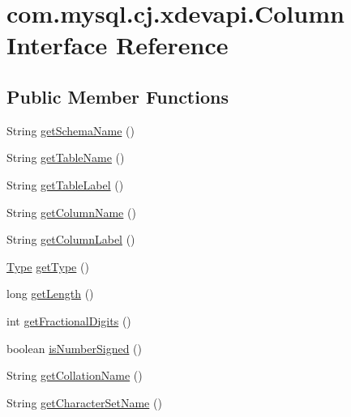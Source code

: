 \hypertarget{interfacecom_1_1mysql_1_1cj_1_1xdevapi_1_1_column}{}\section{com.\+mysql.\+cj.\+xdevapi.\+Column Interface Reference}
\label{interfacecom_1_1mysql_1_1cj_1_1xdevapi_1_1_column}
\subsection*{Public Member Functions}
\begin{DoxyCompactItemize}
\item 
String \mbox{\hyperlink{interfacecom_1_1mysql_1_1cj_1_1xdevapi_1_1_column_a7bd8bc89547c4033cc4518be120a2334}{get\+Schema\+Name}} ()
\item 
String \mbox{\hyperlink{interfacecom_1_1mysql_1_1cj_1_1xdevapi_1_1_column_a118feb37fd110dc65ca175435dbc917a}{get\+Table\+Name}} ()
\item 
String \mbox{\hyperlink{interfacecom_1_1mysql_1_1cj_1_1xdevapi_1_1_column_a8a8627fbc15444ed0a8d6505b26d60f7}{get\+Table\+Label}} ()
\item 
String \mbox{\hyperlink{interfacecom_1_1mysql_1_1cj_1_1xdevapi_1_1_column_a3de92d602b5040a47733a4ccd0ef15df}{get\+Column\+Name}} ()
\item 
String \mbox{\hyperlink{interfacecom_1_1mysql_1_1cj_1_1xdevapi_1_1_column_a13965110411dd642f3673e2d7abaaf78}{get\+Column\+Label}} ()
\item 
\mbox{\hyperlink{enumcom_1_1mysql_1_1cj_1_1xdevapi_1_1_type}{Type}} \mbox{\hyperlink{interfacecom_1_1mysql_1_1cj_1_1xdevapi_1_1_column_a1719a0796fcb7e84cdd4f0eaaa5f39d4}{get\+Type}} ()
\item 
long \mbox{\hyperlink{interfacecom_1_1mysql_1_1cj_1_1xdevapi_1_1_column_a78cbbff61219f8ade2f43bf49dce4c58}{get\+Length}} ()
\item 
int \mbox{\hyperlink{interfacecom_1_1mysql_1_1cj_1_1xdevapi_1_1_column_ac7c43e813c038df1021183627a3dffa7}{get\+Fractional\+Digits}} ()
\item 
boolean \mbox{\hyperlink{interfacecom_1_1mysql_1_1cj_1_1xdevapi_1_1_column_ab19cb4c9c5ad0b8900650cab7b5f9bd6}{is\+Number\+Signed}} ()
\item 
String \mbox{\hyperlink{interfacecom_1_1mysql_1_1cj_1_1xdevapi_1_1_column_af3f5205b507019a4372c02452d3650b1}{get\+Collation\+Name}} ()
\item 
String \mbox{\hyperlink{interfacecom_1_1mysql_1_1cj_1_1xdevapi_1_1_column_acbe28bced9088c55b3d24bc62341a8b5}{get\+Character\+Set\+Name}} ()

\end{DoxyCompactItemize}
